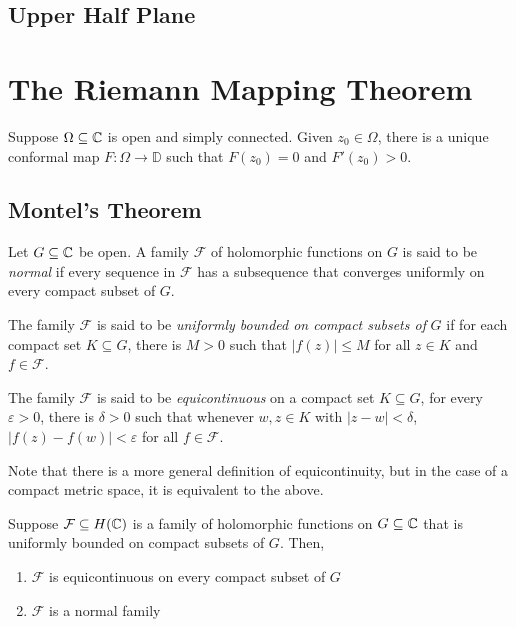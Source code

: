 \subsection{Upper Half Plane}

\section{The Riemann Mapping Theorem}

\begin{theorem}[Riemann]
    Suppose $\Omega\subseteq\mathbb{C}$ is open and simply connected. Given $z_0\in\Omega$, there is a unique conformal map $F:\Omega\to\mathbb D$ such that $F(z_0) = 0$ and $F'(z_0) > 0$.
\end{theorem}

\subsection{Montel's Theorem}

\begin{definition}
    Let $G\subseteq\mathbb{C}$ be open. A family $\mathcal F$ of holomorphic functions on $G$ is said to be \textit{normal} if every sequence in $\mathcal F$ has a subsequence that converges uniformly on every compact subset of $G$.

    The family $\mathcal F$ is said to be \textit{uniformly bounded on compact subsets of} $G$ if for each compact set $K\subseteq G$, there is $M > 0$ such that $|f(z)|\le M$ for all $z\in K$ and $f\in\mathcal F$.

    The family $\mathcal F$ is said to be \textit{equicontinuous} on a compact set $K\subseteq G$, for every $\varepsilon > 0$, there is $\delta > 0$ such that whenever $w,z\in K$ with $|z - w| < \delta$, $|f(z) - f(w)| < \varepsilon$ for all $f\in\mathcal F$.
\end{definition}

Note that there is a more general definition of equicontinuity, but in the case of a compact metric space, it is equivalent to the above.

\begin{theorem}[Montel]
    Suppose $\mathcal F\subseteq H(\mathbb{C})$ is a family of holomorphic functions on $G\subseteq\mathbb{C}$ that is uniformly bounded on compact subsets of $G$. Then,
    \begin{enumerate}[label=(\alph*)]
    \item $\mathcal F$ is equicontinuous on every compact subset of $G$ 
    \item $\mathcal F$ is a normal family
    \end{enumerate}
\end{theorem}


